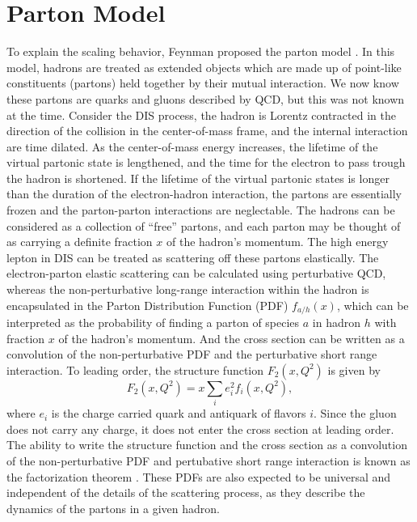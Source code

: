 \documentclass[../main.tex]{subfiles}
\begin{document}
\section{Parton Model}
\label{sec:parton}
To explain the scaling behavior, Feynman proposed the parton model \cite{feynman1969}.
In this model, hadrons are treated as extended objects which are made up of point-like
constituents (partons) held together by their mutual interaction. We now know
these partons are quarks and gluons described by QCD, but this was not known at
the time. Consider the DIS process, the hadron is Lorentz contracted in the
direction of the collision in the center-of-mass frame, and the internal
interaction are time dilated. As the center-of-mass energy increases, the
lifetime of the virtual partonic state is lengthened, and the time for the
electron to pass trough the hadron is shortened. If the lifetime of the virtual
partonic states is longer than the duration of the electron-hadron interaction,
the partons are essentially frozen and the parton-parton interactions are
neglectable. The hadrons can be considered as a collection of ``free'' partons,
and each parton may be thought of as carrying a definite fraction $x$ of the
hadron's momentum. The high energy lepton in DIS can be treated as scattering
off these partons elastically. The electron-parton elastic scattering can be
calculated using perturbative QCD, whereas the non-perturbative long-range
interaction within the hadron is encapsulated in the Parton Distribution
Function (PDF) $f_{a/h}\left(x\right)$, which can be interpreted as the probability
of finding a parton of species $a$ in hadron $h$ with fraction $x$ of the hadron's momentum.
And the cross section can be written as a convolution
of the non-perturbative PDF and the perturbative short range interaction. To leading
order, the structure function $F_2\left(x,Q^2\right)$ is given by
\begin{equation}
	F_2\left(x,Q^2\right)=x\sum_i e^2_i f_i\left(x,Q^2\right),
	\label{eq:F2_parton}
\end{equation}
where $e_i$ is the charge carried quark and antiquark of flavors $i$. Since the
gluon does not carry any charge, it does not enter the cross section at leading
order. The ability to write the structure function and the cross section as a
convolution of the non-perturbative PDF and pertubative short range interaction
is known as the factorization theorem \cite{collins1989}. These PDFs are also
expected to be universal and independent of the details of the scattering
process, as they describe the dynamics of the partons in a given hadron.
\end{document}
